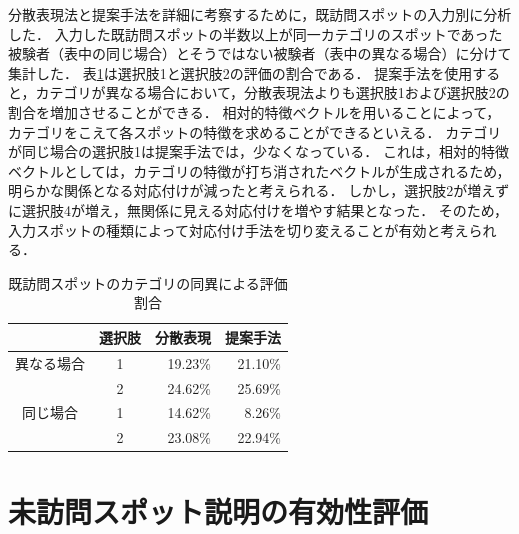 \documentclass[submit]{ipsj}
\begin{document}
分散表現法と提案手法を詳細に考察するために，既訪問スポットの入力別に分析した．
入力した既訪問スポットの半数以上が同一カテゴリのスポットであった被験者（表中の同じ場合）とそうではない被験者（表中の異なる場合）に分けて集計した．
表\ref{table:既訪問スポットのカテゴリの同異による評価割合}は選択肢1と選択肢2の評価の割合である．
提案手法を使用すると，カテゴリが異なる場合において，分散表現法よりも選択肢1および選択肢2の割合を増加させることができる．
相対的特徴ベクトルを用いることによって，カテゴリをこえて各スポットの特徴を求めることができるといえる．
カテゴリが同じ場合の選択肢1は提案手法では，少なくなっている．
これは，相対的特徴ベクトルとしては，カテゴリの特徴が打ち消されたベクトルが生成されるため，明らかな関係となる対応付けが減ったと考えられる．
しかし，選択肢2が増えずに選択肢4が増え，無関係に見える対応付けを増やす結果となった．
そのため，入力スポットの種類によって対応付け手法を切り変えることが有効と考えられる．

\begin{table}[t]
  \caption{既訪問スポットのカテゴリの同異による評価割合}
  \label{table:既訪問スポットのカテゴリの同異による評価割合}
  \centering
  \begin{tabular}{c|c|r|r}
  \hline  \hline
                        & 選択肢 & \multicolumn{1}{c|}{分散表現} & \multicolumn{1}{c}{提案手法} \\ \hline
  異なる場合                 & 1   & 19.23\%                  & 21.10\%                 \\ \cline{2-4}
                        & 2   & 24.62\%                  & 25.69\%                 \\ \hline
  同じ場合                  & 1   & 14.62\%                  & 8.26\%                  \\ \cline{2-4}
  \multicolumn{1}{l|}{} & 2   & 23.08\%                  & 22.94\%                 \\ \hline
  \end{tabular}
\end{table}

\section{未訪問スポット説明の有効性評価}
\label{sec:未訪問スポット説明の有効性評価}
\end{document}
